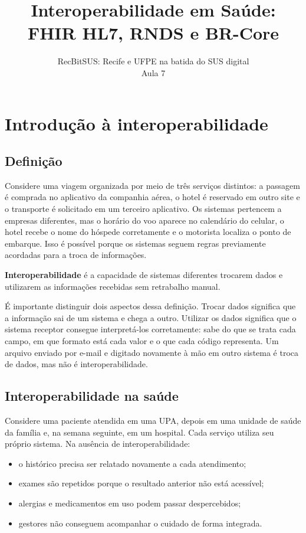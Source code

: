 \documentclass[11pt,a4paper]{article}
\title{Interoperabilidade em Saúde:\\FHIR HL7, RNDS e BR-Core}
\author{RecBitSUS: Recife e UFPE na batida do SUS digital\\ Aula 7}
\date{}
\begin{document}
\maketitle

\section{Introdução à interoperabilidade}
\renewcommand{\sectionbreak}{\clearpage}

\subsection{Definição}

Considere uma viagem organizada por meio de três serviços distintos: a
passagem é comprada no aplicativo da companhia aérea, o hotel é reservado
em outro site e o transporte é solicitado em um terceiro aplicativo. Os
sistemas pertencem a empresas diferentes, mas o horário do voo aparece no
calendário do celular, o hotel recebe o nome do hóspede corretamente e o
motorista localiza o ponto de embarque. Isso é possível porque os sistemas
seguem regras previamente acordadas para a troca de informações.

\textbf{Interoperabilidade} é a capacidade de sistemas diferentes
trocarem dados e utilizarem as informações recebidas sem retrabalho manual.

É importante distinguir dois aspectos dessa definição. Trocar dados
significa que a informação sai de um sistema e chega a outro. Utilizar os
dados significa que o sistema receptor consegue interpretá-los
corretamente: sabe do que se trata cada campo, em que formato está cada
valor e o que cada código representa. Um arquivo enviado por e-mail e
digitado novamente à mão em outro sistema é troca de dados, mas não é
interoperabilidade.

\subsection{Interoperabilidade na saúde}

Considere uma paciente atendida em uma UPA, depois em uma unidade de saúde
da família e, na semana seguinte, em um hospital. Cada serviço utiliza seu
próprio sistema. Na ausência de interoperabilidade:

\begin{itemize}
  \item o histórico precisa ser relatado novamente a cada atendimento;
  \item exames são repetidos porque o resultado anterior não está
    acessível;
  \item alergias e medicamentos em uso podem passar despercebidos;
  \item gestores não conseguem acompanhar o cuidado de forma integrada.
\end{itemize}
\end{document}
